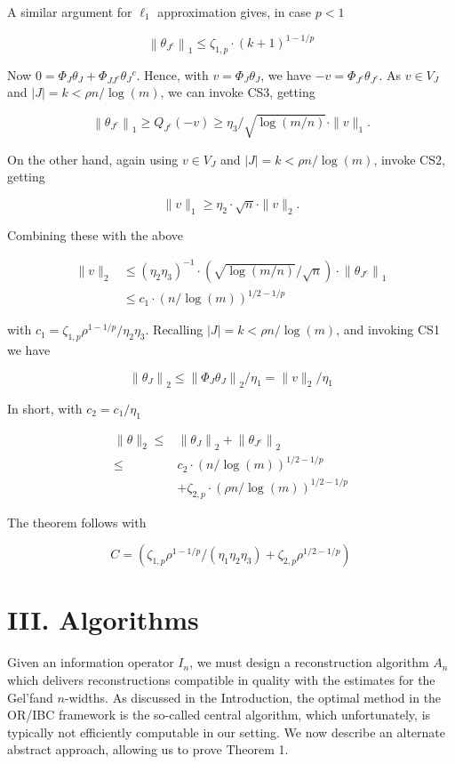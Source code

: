 \documentclass[10pt]{article}
\begin{document}
A similar argument for $\ell_{1}$ approximation gives, in case $p<1$


\begin{equation*}
\left\|\theta_{J^{c}}\right\|_{1} \leq \zeta_{1, p} \cdot(k+1)^{1-1 / p} \tag{II.4}
\end{equation*}


Now $0=\Phi_{J} \theta_{J}+\Phi_{J J^{c}} \theta_{J}{ }^{c}$. Hence, with $v=\Phi_{J} \theta_{J}$, we have $-v=\Phi_{J^{c}} \theta_{J^{c}}$. As $v \in V_{J}$ and $|J|=k<\rho n / \log (m)$, we can invoke CS3, getting

$$
\left\|\theta_{J^{c}}\right\|_{1} \geq Q_{J^{c}}(-v) \geq \eta_{3} / \sqrt{\log (m / n)} \cdot\|v\|_{1} .
$$

On the other hand, again using $v \in V_{J}$ and $|J|=k< \rho n / \log (m)$, invoke CS2, getting

$$
\|v\|_{1} \geq \eta_{2} \cdot \sqrt{n} \cdot\|v\|_{2} .
$$

Combining these with the above

$$
\begin{aligned}
\|v\|_{2} & \leq\left(\eta_{2} \eta_{3}\right)^{-1} \cdot(\sqrt{\log (m / n)} / \sqrt{n}) \cdot\left\|\theta_{J^{c}}\right\|_{1} \\
& \leq c_{1} \cdot(n / \log (m))^{1 / 2-1 / p}
\end{aligned}
$$

with $c_{1}=\zeta_{1, p} \rho^{1-1 / p} / \eta_{2} \eta_{3}$. Recalling $|J|=k<\rho n / \log (m)$, and invoking CS1 we have

$$
\left\|\theta_{J}\right\|_{2} \leq\left\|\Phi_{J} \theta_{J}\right\|_{2} / \eta_{1}=\|v\|_{2} / \eta_{1}
$$

In short, with $c_{2}=c_{1} / \eta_{1}$

$$
\begin{aligned}
\|\theta\|_{2} \leq & \left\|\theta_{J}\right\|_{2}+\left\|\theta_{J^{c}}\right\|_{2} \\
\leq & c_{2} \cdot(n / \log (m))^{1 / 2-1 / p} \\
& +\zeta_{2, p} \cdot(\rho n / \log (m))^{1 / 2-1 / p}
\end{aligned}
$$

The theorem follows with

$$
C=\left(\zeta_{1, p} \rho^{1-1 / p} /\left(\eta_{1} \eta_{2} \eta_{3}\right)+\zeta_{2, p} \rho^{1 / 2-1 / p}\right)
$$

\section*{III. Algorithms}
Given an information operator $I_{n}$, we must design a reconstruction algorithm $A_{n}$ which delivers reconstructions compatible in quality with the estimates for the Gel'fand $n$-widths. As discussed in the Introduction, the optimal method in the OR/IBC framework is the so-called central algorithm, which unfortunately, is typically not efficiently computable in our setting. We now describe an alternate abstract approach, allowing us to prove Theorem 1.
\end{document}
